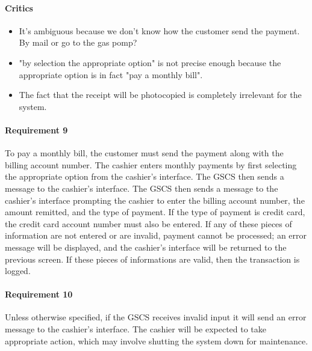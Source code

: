 \begin{framed}
    \paragraph{Critics} 
    \begin{itemize}
        \item It's ambiguous because we don't know how the customer send
            the payment. By mail or go to the gas pomp?

        \item "by selection the appropriate option" is not precise
            enough because the appropriate option is in fact "pay a
            monthly bill".

        \item The fact that the receipt will be photocopied is
            completely irrelevant for the system.
    \end{itemize}

    \paragraph{Requirement 9} To pay a monthly bill, the customer must send
    the payment along with the billing account number. The cashier enters
    monthly payments by first selecting the appropriate option from the
    cashier's interface. The GSCS then sends a message to the cashier's
    interface. The GSCS then sends a message to the cashier's interface
    prompting the cashier to enter the billing account number, the amount
    remitted, and the type of payment.
    If the type of payment is credit card, the credit
    card account number must also be entered.
    If any of these pieces of information
    are not entered or are invalid, payment cannot be processed; an error
    message will be displayed, and the cashier's interface will be returned
    to the previous screen. 
    If these pieces of informations are valid, then the transaction is logged.
\end{framed}

\paragraph{Requirement 10} Unless otherwise specified, if the GSCS receives
invalid input it will send an error message to the cashier's interface.
The cashier will be expected to take appropriate action, which may
involve shutting the system down for maintenance.

